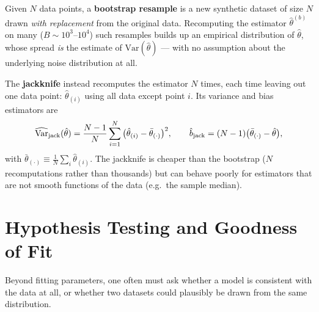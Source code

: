 \begin{definition}[Bootstrap]
	Given $N$ data points, a \textbf{bootstrap resample} is a new synthetic dataset of size $N$ drawn \emph{with replacement} from the original data. Recomputing the estimator $\hat\theta^{(b)}$ on many ($B\sim10^3$--$10^4$) such resamples builds up an empirical distribution of $\hat\theta$, whose spread \emph{is} the estimate of $\mathrm{Var}(\hat\theta)$ --- with no assumption about the underlying noise distribution at all.
\end{definition}

\begin{definition}[Jackknife]
	The \textbf{jackknife} instead recomputes the estimator $N$ times, each time leaving out one data point: $\hat\theta_{(i)}$ using all data except point $i$. Its variance and bias estimators are
	\begin{equation}
		\widehat{\mathrm{Var}}_{\rm jack}(\hat\theta) = \frac{N-1}{N}\sum_{i=1}^N\big(\hat\theta_{(i)}-\bar\theta_{(\cdot)}\big)^2, \qquad
		\hat b_{\rm jack} = (N-1)\big(\bar\theta_{(\cdot)}-\hat\theta\big),
		\label{eq:jackknife}
	\end{equation}
	with $\bar\theta_{(\cdot)}\equiv\frac1N\sum_i\hat\theta_{(i)}$. The jackknife is cheaper than the bootstrap ($N$ recomputations rather than thousands) but can behave poorly for estimators that are not smooth functions of the data (e.g.\ the sample median).
\end{definition}

\section{Hypothesis Testing and Goodness of Fit}

Beyond fitting parameters, one often must ask whether a model is consistent with the data at all, or whether two datasets could plausibly be drawn from the same distribution.

